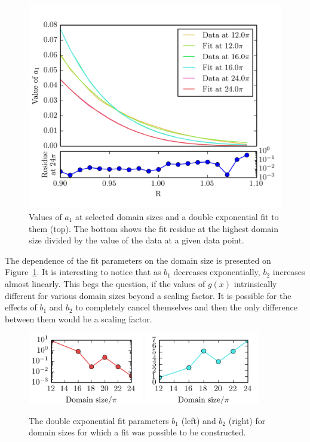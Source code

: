 \documentclass[11pt,a4paper]{article}
\begin{document}
\begin{figure}[h!]
    \centering
    \includegraphics[width=\textwidth]{double_exp_fit}
    \caption{Values of $a_1$ at selected domain sizes and a double exponential fit to them (top). The bottom shows the fit residue at the highest domain size divided by the value of the data at a given data point.}
\end{figure}

The dependence of the fit parameters on the domain size is presented on Figure~\ref{img:b_params}.
It is interesting to notice that as $b_1$ decreases exponentially, $b_2$ increases almost linearly.
This begs the question, if the values of $g(x)$ intrinsically different for various domain sizes beyond a scaling factor.
It is possible for the effects of $b_1$ and $b_2$ to completely cancel themselves and then the only difference between them would be a scaling factor.

\begin{figure}[H]
    \centering
    \includegraphics[width=0.45\textwidth]{b1_vs_domain.png}
    \includegraphics[width=0.45\textwidth]{b2_vs_domain.png}
    \caption{The double exponential fit parameters $b_1$ (left) and $b_2$ (right) for domain sizes for which a fit was possible to be constructed.}\label{img:b_params}
\end{figure}
\end{document}
